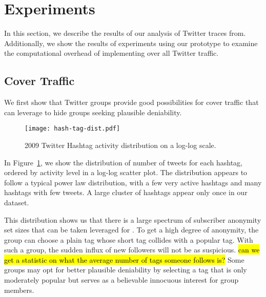 \section{Experiments}
\label{sec:experiments}

In this section, we describe the results of our analysis of Twitter
traces from. Additionally, we show the results of experiments using our
prototype to examine the computational overhead of implementing \hoot
over all Twitter traffic.

\subsection{Cover Traffic}

We first show that Twitter groups provide good possibilities for cover
traffic that \hoot can leverage to hide groups seeking plausible
deniability.

\begin{figure}
\begin{center}
\texttt{[image: hash-tag-dist.pdf]}
\caption{2009 Twitter Hashtag activity distribution on a log-log
  scale.\label{fig:hash-dist}
}
\end{center}
\end{figure}

In Figure~\ref{fig:hash-dist}, we show the distribution of number of
tweets for each hashtag, ordered by activity level in a log-log scatter
plot.  The
distribution appears to follow a typical power law distribution, with a
few very active hashtags and many hashtags with few tweets. A large
cluster of hashtags appear only once in our dataset. 

This distribution shows us that there is a large spectrum of subscriber
anonymity set sizes that can be taken leveraged for \hoot. To get a high
degree of anonymity, the group can choose a plain tag whose short tag
collides with a popular tag. With such a group, the sudden influx of new
followers will not be as suspicious. \hl{can we get a statistic on what
  the average number of tags someone follows is?}  Some groups may opt
for better plausible deniability by selecting a tag that is only
moderately popular but serves as a believable innocuous interest for
group members.

